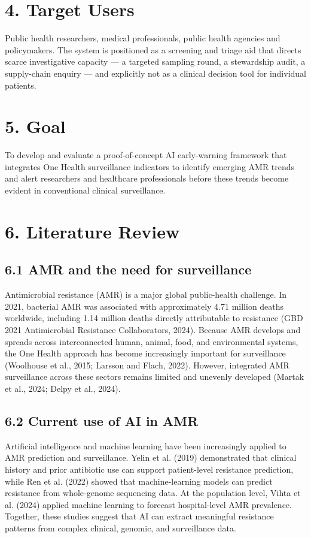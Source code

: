 \documentclass[11pt,a4paper]{article}
\begin{document}
\section*{4. Target Users}

Public health researchers, medical professionals, public health agencies and policymakers. The system is positioned as a screening and triage aid that directs scarce investigative capacity — a targeted sampling round, a stewardship audit, a supply-chain enquiry — and explicitly not as a clinical decision tool for individual patients.

\section*{5. Goal}

To develop and evaluate a proof-of-concept AI early-warning framework that integrates One Health surveillance indicators to identify emerging AMR trends and alert researchers and healthcare professionals before these trends become evident in conventional clinical surveillance.

\section*{6. Literature Review}

\subsection*{6.1 AMR and the need for surveillance}

Antimicrobial resistance (AMR) is a major global public-health challenge. In 2021, bacterial AMR was associated with approximately 4.71 million deaths worldwide, including 1.14 million deaths directly attributable to resistance (GBD 2021 Antimicrobial Resistance Collaborators, 2024). Because AMR develops and spreads across interconnected human, animal, food, and environmental systems, the One Health approach has become increasingly important for surveillance (Woolhouse et al., 2015; Larsson and Flach, 2022). However, integrated AMR surveillance across these sectors remains limited and unevenly developed (Martak et al., 2024; Delpy et al., 2024).

\subsection*{6.2 Current use of AI in AMR}

Artificial intelligence and machine learning have been increasingly applied to AMR prediction and surveillance. Yelin et al. (2019) demonstrated that clinical history and prior antibiotic use can support patient-level resistance prediction, while Ren et al. (2022) showed that machine-learning models can predict resistance from whole-genome sequencing data. At the population level, Vihta et al. (2024) applied machine learning to forecast hospital-level AMR prevalence. Together, these studies suggest that AI can extract meaningful resistance patterns from complex clinical, genomic, and surveillance data.
\end{document}

